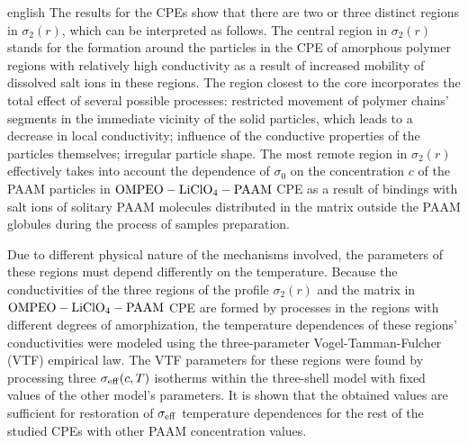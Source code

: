 \begin{otherlanguage*}{english}
The results for the CPEs show that there are two or three distinct regions in $ \sigma_2 (r) $, which can be interpreted as follows. The central region in $ \sigma_2 (r) $ stands for the formation around the particles in the CPE of amorphous polymer regions with relatively high conductivity as a result of increased mobility of dissolved salt ions in these regions. The region closest to the core incorporates the total effect of several possible processes: restricted movement of polymer chains' segments in the immediate vicinity of the solid particles, which leads to a decrease in local conductivity; influence of the conductive properties of the particles themselves; irregular particle shape. The most remote region in $ \sigma_2 (r) $ effectively takes into account the dependence of $ \sigma_0 $ on the concentration $ c $ of the PAAM particles in $ \rm OMPEO-LiClO_4-PAAM $ CPE as a result of bindings with salt ions of solitary PAAM molecules distributed in the matrix outside the PAAM globules during the process of samples preparation.

Due to different physical nature of the mechanisms involved, the parameters of these regions must depend differently on the temperature. Because the conductivities of the three regions of the profile $ \sigma_2 (r) $ and the matrix in $ \rm OMPEO-LiClO_4-PAAM $  CPE are formed by processes in the regions with different degrees of amorphization, the temperature dependences of these regions' conductivities were modeled using the three-parameter Vogel-Tamman-Fulcher  (VTF) empirical law. The VTF parameters for these regions were found by processing three $ \sigma_ {\rm eff} (c, T) $ isotherms  within the three-shell model with fixed values  of the other model's parameters. It is shown that the obtained values are sufficient for restoration of $ \sigma_ {\rm eff} $ temperature dependences for the rest of the studied CPEs with other  PAAM concentration values.


\end{otherlanguage*}
